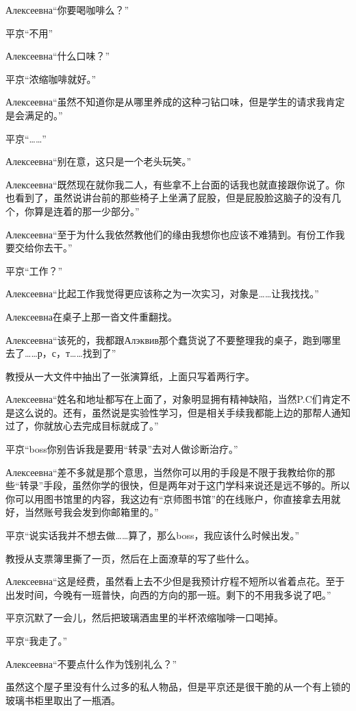 \documentclass{article}
\begin{document}
Алексеевна“你要喝咖啡么？”

平京“不用”

Алексеевна“什么口味？”

平京“浓缩咖啡就好。”

Алексеевна“虽然不知道你是从哪里养成的这种刁钻口味，但是学生的请求我肯定是会满足的。”

平京“……”

Алексеевна“别在意，这只是一个老头玩笑。”

Алексеевна“既然现在就你我二人，有些拿不上台面的话我也就直接跟你说了。你也看到了，虽然说讲台前的那些椅子上坐满了屁股，但是屁股脸这脑子的没有几个，你算是连着的那一少部分。”

Алексеевна“至于为什么我依然教他们的缘由我想你也应该不难猜到。有份工作我要交给你去干。”

平京“工作？”

Алексеевна“比起工作我觉得更应该称之为一次实习，对象是……让我找找。”

Алексеевна在桌子上那一沓文件重翻找。

Алексеевна“该死的，我都跟Алэквив那个蠢货说了不要整理我的桌子，跑到哪里去了……р，с，т……找到了”

教授从一大文件中抽出了一张演算纸，上面只写着两行字。

Алексеевна“姓名和地址都写在上面了，对象明显拥有精神缺陷，当然P.C们肯定不是这么说的。还有，虽然说是实验性学习，但是相关手续我都能上边的那帮人通知过了，你就放心去完成目标就成了。”

平京“boss你别告诉我是要用“转录”去对人做诊断治疗。”

Алексеевна“差不多就是那个意思，当然你可以用的手段是不限于我教给你的那些“转录”手段，虽然你学的很快，但是两年对于这门学科来说还是远不够的。所以你可以用图书馆里的内容，我这边有“京师图书馆”的在线账户，你直接拿去用就好，当然账号我会发到你邮箱里的。”

平京“说实话我并不想去做……算了，那么boss，我应该什么时候出发。”

教授从支票簿里撕了一页，然后在上面潦草的写了些什么。

Алексеевна“这是经费，虽然看上去不少但是我预计疗程不短所以省着点花。至于出发时间，今晚有一班普快，向西的方向的那一班。剩下的不用我多说了吧。”

平京沉默了一会儿，然后把玻璃酒盅里的半杯浓缩咖啡一口喝掉。

平京“我走了。”

Алексеевна“不要点什么作为饯别礼么？”

虽然这个屋子里没有什么过多的私人物品，但是平京还是很干脆的从一个有上锁的玻璃书柜里取出了一瓶酒。
\end{document}
